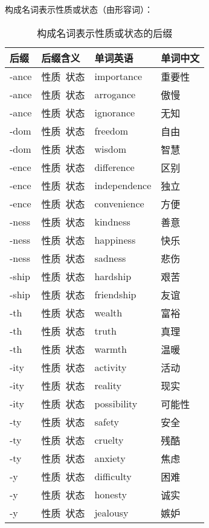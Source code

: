 \documentclass[UTF8]{ctexart}
\begin{document}
\newpage

    构成名词表示性质或状态（由形容词）：\vspace{5pt}
    \begin{table}[h!]
        \begin{center}
            \ttfamily
            \begin{tabular}{p{40pt}|p{80pt}|p{80pt}|p{80pt}}
                \hline
                后缀&后缀含义&单词英语&单词中文\\ \hline
                -ance&性质~状态&importance&重要性\\ \hline
                -ance&性质~状态&arrogance&傲慢\\ \hline
                -ance&性质~状态&ignorance&无知\\ \hline
                -dom&性质~状态&freedom&自由\\ \hline
                -dom&性质~状态&wisdom&智慧\\ \hline
                -ence&性质~状态&difference&区别\\ \hline
                -ence&性质~状态&independence&独立\\ \hline
                -ence&性质~状态&convenience&方便\\ \hline
                -ness&性质~状态&kindness&善意\\ \hline
                -ness&性质~状态&happiness&快乐\\ \hline
                -ness&性质~状态&sadness&悲伤\\ \hline
                -ship&性质~状态&hardship&艰苦\\ \hline
                -ship&性质~状态&friendship&友谊\\ \hline
                -th&性质~状态&wealth&富裕\\ \hline
                -th&性质~状态&truth&真理\\ \hline
                -th&性质~状态&warmth&温暖\\ \hline
                -ity&性质~状态&activity&活动\\ \hline
                -ity&性质~状态&reality&现实\\ \hline
                -ity&性质~状态&possibility&可能性\\ \hline
                -ty&性质~状态&safety&安全\\ \hline
                -ty&性质~状态&cruelty&残酷\\ \hline
                -ty&性质~状态&anxiety&焦虑\\ \hline
                -y&性质~状态&difficulty&困难\\ \hline
                -y&性质~状态&honesty&诚实\\ \hline
                -y&性质~状态&jealousy&嫉妒\\ \hline
            \end{tabular}
            \rmfamily
            \caption{构成名词表示性质或状态的后缀}
        \end{center}
    \end{table}\\
\end{document}
